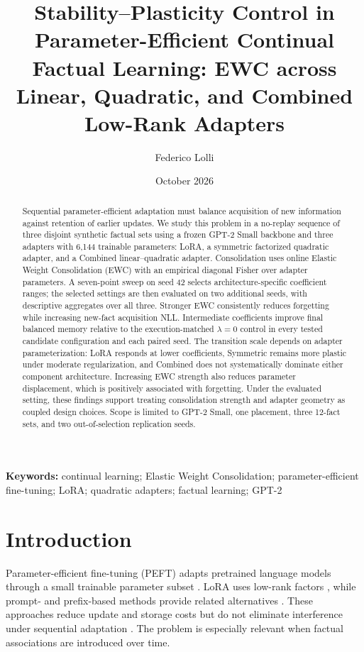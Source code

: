 \documentclass[12pt,a4paper]{article}
\title{\textbf{Stability–Plasticity Control in Parameter-Efficient Continual Factual Learning: EWC across Linear, Quadratic, and Combined Low-Rank Adapters}}
\author{Federico Lolli}
\date{October 2026}
\begin{document}
\maketitle
\begin{abstract}
Sequential parameter-efficient adaptation must balance acquisition of new information against retention of earlier updates. We study this problem in a no-replay sequence of three disjoint synthetic factual sets using a frozen GPT-2 Small backbone and three adapters with 6,144 trainable parameters: LoRA, a symmetric factorized quadratic adapter, and a Combined linear–quadratic adapter. Consolidation uses online Elastic Weight Consolidation (EWC) with an empirical diagonal Fisher over adapter parameters. A seven-point sweep on seed 42 selects architecture-specific coefficient ranges; the selected settings are then evaluated on two additional seeds, with descriptive aggregates over all three. Stronger EWC consistently reduces forgetting while increasing new-fact acquisition NLL. Intermediate coefficients improve final balanced memory relative to the execution-matched \(\lambda=0\) control in every tested candidate configuration and each paired seed. The transition scale depends on adapter parameterization: LoRA responds at lower coefficients, Symmetric remains more plastic under moderate regularization, and Combined does not systematically dominate either component architecture. Increasing EWC strength also reduces parameter displacement, which is positively associated with forgetting. Under the evaluated setting, these findings support treating consolidation strength and adapter geometry as coupled design choices. Scope is limited to GPT-2 Small, one placement, three 12-fact sets, and two out-of-selection replication seeds.
\end{abstract}
\noindent\textbf{Keywords:} continual learning; Elastic Weight Consolidation; parameter-efficient fine-tuning; LoRA; quadratic adapters; factual learning; GPT-2
\section{Introduction}
Parameter-efficient fine-tuning (PEFT) adapts pretrained language models through a small trainable parameter subset \cite{ref4}. LoRA uses low-rank factors \cite{ref2}, while prompt- and prefix-based methods provide related alternatives \cite{ref5,ref6}. These approaches reduce update and storage costs but do not eliminate interference under sequential adaptation \cite{ref1,ref7,ref8}. The problem is especially relevant when factual associations are introduced over time.
\end{document}
